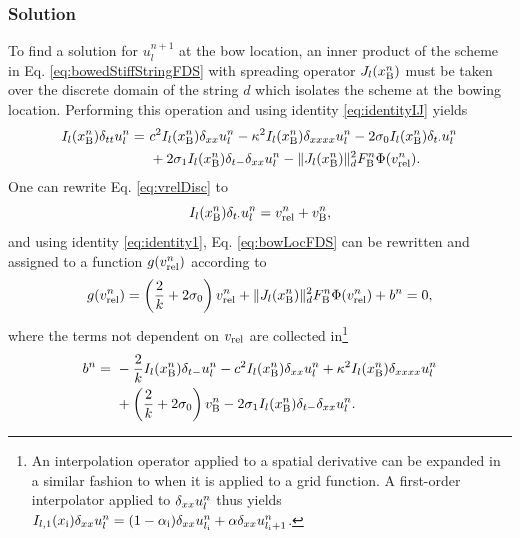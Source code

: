 \subsubsection{Solution}
To find a solution for $u_l^{n+1}$ at the bow location, an inner product of the scheme in Eq. \eqref{eq:bowedStiffStringFDS} with spreading operator $J_l(x_{\text{B}}^n)$ must be taken over the discrete domain of the string $d$ which isolates the scheme at the bowing location. Performing this operation and using identity \eqref{eq:identityIJ} yields
\begin{equation}\label{eq:bowLocFDS}
    \begin{aligned}
    I_l(x_{\text{B}}^n)\delta_{tt}u_l^n =\ &c^2 I_l(x_{\text{B}}^n)\delta_{xx} u_l^n - \kappa^2 I_l(x_{\text{B}}^n)\delta_{xxxx} u_l^n- 2 \sigma_{0} I_l(x_{\text{B}}^n)\delta_{t\cdot} u_l^n\\
    & + 2 \sigma_{1} I_l(x_{\text{B}}^n)\delta_{t-}\delta_{xx} u_l^n - \lVert J_l(x_{\text{B}}^n)\rVert^2_d F_{\text{B}}^n\Phi(v_\text{rel}^n).
    \end{aligned}
\end{equation}
One can rewrite Eq. \eqref{eq:vrelDisc} to 
\begin{equation}\label{eq:vrelRewritten}
   I_l(x_{\text{B}}^n)\delta_{t\cdot} u_l^n =  v_\text{rel}^n + v_{\text{B}}^n,
\end{equation}
and using identity \eqref{eq:identity1}, Eq. \eqref{eq:bowLocFDS} can be rewritten and assigned to a function $g(v_\text{rel}^n)$ according to 
\begin{equation}\label{eq:staticFrictionNRfunc}
    g(v_\text{rel}^n) = \left(\frac{2}{k} + 2\sigma_{0}\right)v_\text{rel}^n + \lVert J_l(x_{\text{B}}^n)\rVert^2_d F_{\text{B}}^n\Phi(v_\text{rel}^n) + b^n = 0,
\end{equation}
where the terms not dependent on $v_\text{rel}$ are collected in\footnote{An interpolation operator applied to a spatial derivative can be expanded in a similar fashion to when it is applied to a grid function. A first-order interpolator applied to $\delta_{xx} u_l^n$ thus yields $I_{l,1}(x_{\text{i}}) \delta_{xx} u_l^n = (1-\alpha_{\text{i}})\delta_{xx} u_{l_{\text{i}}}^n + \alpha \delta_{xx} u_{l_{\text{i}}+1}^n$.}
\begin{equation}\label{eq:staticbDef}
    \begin{aligned}
        b^n =\ &-\frac{2}{k}I_l(x_{\text{B}}^n)\delta_{t-} u_l^n-c^2 I_l(x_{\text{B}}^n)\delta_{xx} u_l^n + \kappa^2 I_l(x_{\text{B}}^n)\delta_{xxxx} u_l^n \\
        &+ \left( \frac{2}{k} + 2 \sigma_{0} \right)v_{\text{B}}^n - 2 \sigma_{1} I_l(x_{\text{B}}^n)\delta_{t-}\delta_{xx} u_l^n.
    \end{aligned}
\end{equation}
%


